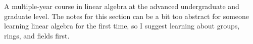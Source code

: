 A multiple-year course in linear algebra at the advanced undergraduate and graduate level. The notes for this section can be a bit too abstract for someone learning linear algebra for the first time, so I suggest learning about groups, rings, and fields first. 

